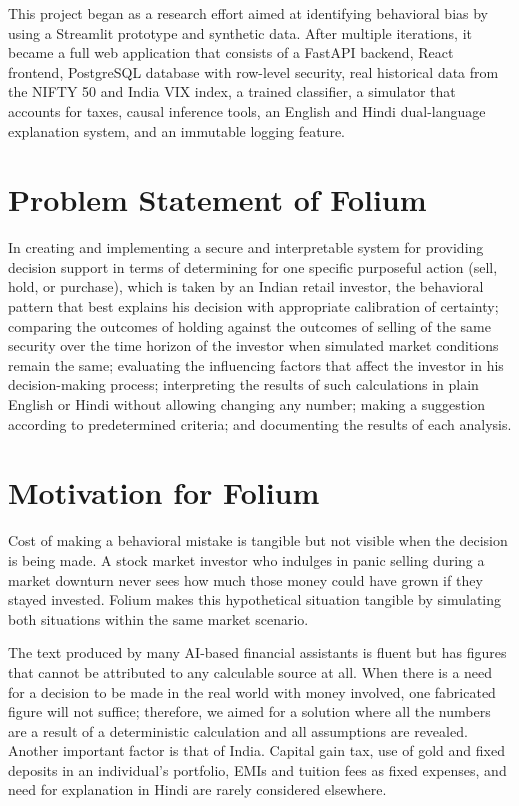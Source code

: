 This project began as a research effort aimed at identifying behavioral bias by using a Streamlit prototype and synthetic data. After multiple iterations, it became a full web application that consists of a FastAPI backend, React frontend, PostgreSQL database with row-level security, real historical data from the NIFTY 50 and India VIX index, a trained classifier, a simulator that accounts for taxes, causal inference tools, an English and Hindi dual-language explanation system, and an immutable logging feature.

\section{Problem Statement of Folium}
In creating and implementing a secure and interpretable system for providing decision support in terms of determining for one specific purposeful action (sell, hold, or purchase), which is taken by an Indian retail investor, the behavioral pattern that best explains his decision with appropriate calibration of certainty; comparing the outcomes of holding against the outcomes of selling of the same security over the time horizon of the investor when simulated market conditions remain the same; evaluating the influencing factors that affect the investor in his decision-making process; interpreting the results of such calculations in plain English or Hindi without allowing changing any number; making a suggestion according to predetermined criteria; and documenting the results of each analysis.

\section{Motivation for Folium}
Cost of making a behavioral mistake is tangible but not visible when the decision is being made. A stock market investor who indulges in panic selling during a market downturn never sees how much those money could have grown if they stayed invested. Folium makes this hypothetical situation tangible by simulating both situations within the same market scenario.

The text produced by many AI-based financial assistants is fluent but has figures that cannot be attributed to any calculable source at all. When there is a need for a decision to be made in the real world with money involved, one fabricated figure will not suffice; therefore, we aimed for a solution where all the numbers are a result of a deterministic calculation and all assumptions are revealed. Another important factor is that of India. Capital gain tax, use of gold and fixed deposits in an individual’s portfolio, EMIs and tuition fees as fixed expenses, and need for explanation in Hindi are rarely considered elsewhere.

